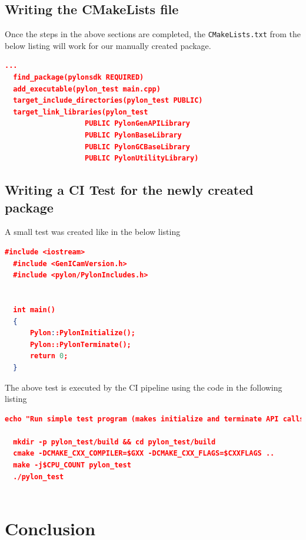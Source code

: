 \documentclass[a4paper, 12pt, oneside]{report}
\begin{document}
  \section{Writing the CMakeLists file}
  Once the steps in the above sections are completed, the \texttt{CMakeLists.txt} from the below listing will work for our manually created package. 
  
  \begin{lstlisting}[language=json,firstnumber=1] 
  ...
  find_package(pylonsdk REQUIRED)
  add_executable(pylon_test main.cpp)
  target_include_directories(pylon_test PUBLIC)
  target_link_libraries(pylon_test 
                   PUBLIC PylonGenAPILibrary
                   PUBLIC PylonBaseLibrary 
                   PUBLIC PylonGCBaseLibrary
                   PUBLIC PylonUtilityLibrary)
  \end{lstlisting} 

  \section{Writing a CI Test for the newly created package}
  A small test was created like in the below listing
  
  \begin{lstlisting}[language=json,firstnumber=1] 
  #include <iostream>
  #include <GenICamVersion.h>
  #include <pylon/PylonIncludes.h>
  
  
  int main()
  {
      Pylon::PylonInitialize();
      Pylon::PylonTerminate();
      return 0;
  }
  \end{lstlisting} 
  
  
  The above test is executed by the CI pipeline using the code in the following listing
  
  \begin{lstlisting}[language=json,firstnumber=1] 
  echo "Run simple test program (makes initialize and terminate API calls)"
  
  mkdir -p pylon_test/build && cd pylon_test/build
  cmake -DCMAKE_CXX_COMPILER=$GXX -DCMAKE_CXX_FLAGS=$CXXFLAGS ..
  make -j$CPU_COUNT pylon_test
  ./pylon_test
  
  \end{lstlisting} 

  \newpage
  
  \chapter{Conclusion}
  
\end{document}
